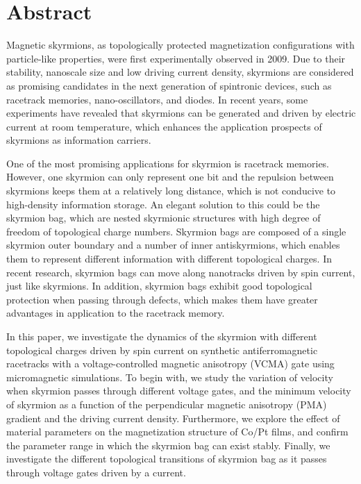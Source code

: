 \chapter*{Abstract}
Magnetic skyrmions, as topologically protected magnetization configurations with particle-like properties, were first experimentally observed in 2009. 
Due to their stability, nanoscale size and low driving current density, skyrmions are considered as promising candidates in the next generation of spintronic devices, such as racetrack memories, nano-oscillators, and diodes. 
In recent years, some experiments have revealed that skyrmions can be generated and driven by electric current at room temperature, which enhances the application prospects of skyrmions as information carriers. \par
One of the most promising applications for skyrmion is racetrack memories. 
However, one skyrmion can only represent one bit and the repulsion between skyrmions keeps them at a relatively long distance, which is not conducive to high-density information storage. 
An elegant solution to this could be the skyrmion bag, which are nested skyrmionic structures with high degree of freedom of topological charge numbers. 
Skyrmion bags are composed of a single skyrmion outer boundary and a number of inner antiskyrmions, which enables them to represent different information with different topological charges. 
In recent research, skyrmion bags can move along nanotracks driven by spin current, just like skyrmions. 
In addition, skyrmion bags exhibit good topological protection when passing through defects, which makes them have greater advantages in application to the racetrack memory.\par
In this paper, we investigate the dynamics of the skyrmion with different topological charges driven by spin current on synthetic antiferromagnetic racetracks with a voltage-controlled magnetic anisotropy (VCMA) gate using micromagnetic simulations. 
To begin with, we study the variation of velocity when skyrmion passes through different voltage gates, and the minimum velocity of skyrmion as a function of the perpendicular magnetic anisotropy (PMA) gradient and the driving current density. 
Furthermore, we explore the effect of material parameters on the magnetization structure of Co/Pt films, and confirm the parameter range in which the skyrmion bag can exist stably. 
Finally, we investigate the different topological transitions of skyrmion bag as it passes through voltage gates driven by a current. 
